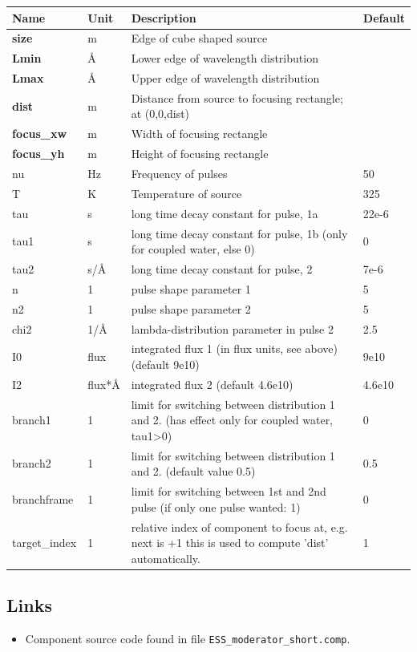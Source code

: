 \begin{longtable}{p{}p{}p{}p{}}
\toprule
\textbf{Name} & \textbf{Unit} & \textbf{Description} & \textbf{Default} \\
\midrule
\endhead
\textbf{size} & m & Edge of cube shaped source &  \\
\textbf{Lmin} & \AA{} & Lower edge of wavelength distribution &  \\
\textbf{Lmax} & \AA{} & Upper edge of wavelength distribution &  \\
\textbf{dist} & m & Distance from source to focusing rectangle; at (0,0,dist) &  \\
\textbf{focus\_xw} & m & Width of focusing rectangle &  \\
\textbf{focus\_yh} & m & Height of focusing rectangle &  \\
nu & Hz & Frequency of pulses & 50 \\
T & K & Temperature of source & 325 \\
tau & s & long time decay constant for pulse, 1a & 22e-6 \\
tau1 & s & long time decay constant for pulse, 1b (only for coupled water, else 0) & 0 \\
tau2 & s/\AA{} & long time decay constant for pulse, 2 & 7e-6 \\
n & 1 & pulse shape parameter 1 & 5 \\
n2 & 1 & pulse shape parameter 2 & 5 \\
chi2 & 1/\AA{} & lambda-distribution parameter in pulse 2 & 2.5 \\
I0 & flux & integrated flux 1 (in flux units, see above) (default 9e10) & 9e10 \\
I2 & flux*\AA{} & integrated flux 2 (default 4.6e10) & 4.6e10 \\
branch1 & 1 & limit for switching between distribution 1 and 2. (has effect only for coupled water, tau1\textgreater{}0) & 0 \\
branch2 & 1 & limit for switching between distribution 1 and 2. (default value 0.5) & 0.5 \\
branchframe & 1 & limit for switching between 1st and 2nd pulse (if only one pulse wanted: 1) & 0 \\
target\_index & 1 & relative index of component to focus at, e.g. next is +1 this is used to compute 'dist' automatically. & 1 \\
\bottomrule
\end{longtable}

\subsection*{Links}
\begin{itemize}
  \item Component source code found in file \texttt{ESS\_moderator\_short.comp}.
\end{itemize}
